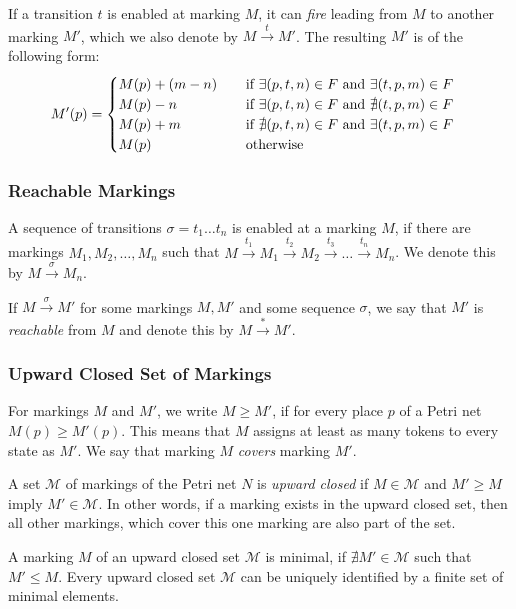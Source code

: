 If a transition $t$ is enabled at marking $M$, it can \emph{fire} leading from $M$ to another marking $M'$, which we also denote by  $M \xrightarrow{t} M'$. 
The resulting $M'$ is of the following form:
\begin{equation*}
M'(p) =  
\begin{cases}
\mathrlap{M(p) + (m - n)}\hphantom{M(p) + (m - n) + 1} \text{ if } \exists (p,t,n) \in F \text{ and } \exists (t,p,m) \in F \\
\mathrlap{M(p) - n}\hphantom{M(p) + (m - n) + 1} \text{ if } \exists (p,t,n) \in F \text{ and } \nexists (t,p,m) \in F \\
\mathrlap{M(p) + m}\hphantom{M(p) + (m - n) + 1} \text{ if }  \nexists (p,t,n) \in F \text{ and } \exists (t,p,m) \in F  \\
\mathrlap{M(p)}\hphantom{M(p) + (m - n) + 1} \text{ otherwise}
\end{cases}
\end{equation*}

\subsubsection{Reachable Markings}
A sequence of transitions $\sigma = t_{1} \dots t_{n}$ is enabled at a marking $M$, if there are markings $M_{1},M_{2},\dots,M_{n}$ such that $M \xrightarrow{t_{1}} M_{1} \xrightarrow{t_{2}} M_{2} \xrightarrow{t_{3}} \dots \xrightarrow{t_{n}} M_{n}$. We denote this by $M \xrightarrow{\sigma} M_{n}$. 

If $M \xrightarrow{\sigma} M'$ for some markings $M,M'$ and some sequence $\sigma$, we say that $M'$ is \emph{reachable} from $M$ and denote this by $M \xrightarrow{*} M'$.


\subsubsection{Upward Closed Set of Markings}
For markings $M$ and $M'$, we write $M \ge M'$, if for every place $p$ of a Petri net $M(p) \ge M'(p)$. This means that $M$ assigns at least as many tokens to every state as $M'$. We say that marking $M$ \emph{covers} marking $M'$.


A set $\mathcal{M}$ of markings of the Petri net $N$ is \emph{upward closed} if $M \in \mathcal{M}$ and $M' \ge M$ imply $M' \in \mathcal{M}$. In other words, if a marking exists in the upward closed set, then all other markings, which cover this one marking are also part of the set.

A marking $M$ of an upward closed set $\mathcal{M}$ is minimal, if $\nexists M' \in \mathcal{M}$ such that $M' \le M$. Every upward closed set $\mathcal{M}$ can be uniquely identified by a finite set of minimal elements. 
